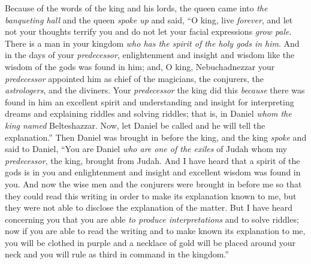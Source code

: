 \begin{biblechapter}
\verse Because of the words of the king and his lords, the queen came into \textit{the banqueting hall} and the queen \textit{spoke up} and said, “O king, live \textit{forever}, and let not your thoughts terrify you and do not let your facial expressions \textit{grow pale}.
\verse There is a man in your kingdom \textit{who has the spirit of the holy gods in him}. And in the days of your \textit{predecessor}, enlightenment and insight and wisdom like the wisdom of the gods was found in him; and, O king, Nebuchadnezzar your \textit{predecessor} appointed him as chief of the magicians, the conjurers, the \textit{astrologers}, and the diviners. Your \textit{predecessor} the king did this
\verse \textit{because} there was found in him an excellent spirit and understanding and insight for interpreting dreams and explaining riddles and solving riddles; that is, in Daniel \textit{whom the king named} Belteshazzar. Now, let Daniel be called and he will tell the explanation.”
 Then Daniel was brought in before the king, and the king \textit{spoke} and said to Daniel, “You are Daniel \textit{who are one of the exiles} of Judah whom my \textit{predecessor}, the king, brought from Judah.
\verse And I have heard that a spirit of the gods is in you and enlightenment and insight and excellent wisdom was found in you.
\verse And now the wise men and the conjurers were brought in before me so that they could read this writing in order to make its explanation known to me, but they were not able to disclose the explanation of the matter.
\verse But I have heard concerning you that you are able \textit{to produce interpretations} and to solve riddles; now if you are able to read the writing and to make known its explanation to me, you will be clothed in purple and a necklace of gold will be placed around your neck and you will rule as third in command in the kingdom.”

\end{biblechapter}
